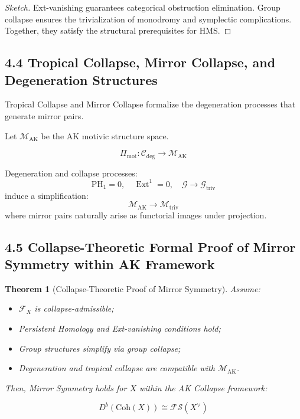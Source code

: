 \documentclass[11pt]{article}
\newtheorem{theorem}{Theorem}[section]
\DeclareMathOperator{\Ext}{Ext}
\begin{document}
\begin{proof}[Sketch]
Ext-vanishing guarantees categorical obstruction elimination. Group collapse ensures the trivialization of monodromy and symplectic complications. Together, they satisfy the structural prerequisites for HMS.
\end{proof}

\subsection{4.4 Tropical Collapse, Mirror Collapse, and Degeneration Structures}

Tropical Collapse and Mirror Collapse formalize the degeneration processes that generate mirror pairs.

Let $\mathcal{M}_{\mathrm{AK}}$ be the AK motivic structure space.

\begin{equation}
\Pi_{\mathrm{mot}} : \mathcal{C}_{\mathrm{deg}} \longrightarrow \mathcal{M}_{\mathrm{AK}}
\end{equation}

Degeneration and collapse processes:
\begin{equation}
\mathrm{PH}_1 = 0, \quad \Ext^1 = 0, \quad \mathcal{G} \longrightarrow \mathcal{G}_{\mathrm{triv}}
\end{equation}
induce a simplification:
\begin{equation}
\mathcal{M}_{\mathrm{AK}} \longrightarrow \mathcal{M}_{\mathrm{triv}}
\end{equation}
where mirror pairs naturally arise as functorial images under projection.

\subsection{4.5 Collapse-Theoretic Formal Proof of Mirror Symmetry within AK Framework}

\begin{theorem}[Collapse-Theoretic Proof of Mirror Symmetry]
Assume:

\begin{itemize}
    \item $\mathcal{F}_X$ is collapse-admissible;
    \item Persistent Homology and Ext-vanishing conditions hold;
    \item Group structures simplify via group collapse;
    \item Degeneration and tropical collapse are compatible with $\mathcal{M}_{\mathrm{AK}}$.
\end{itemize}

Then, Mirror Symmetry holds for $X$ within the AK Collapse framework:

\begin{equation}
D^b(\mathrm{Coh}(X)) \cong \mathcal{F}\mathcal{S}(X^\vee)
\end{equation}
\end{theorem}
\end{document}
